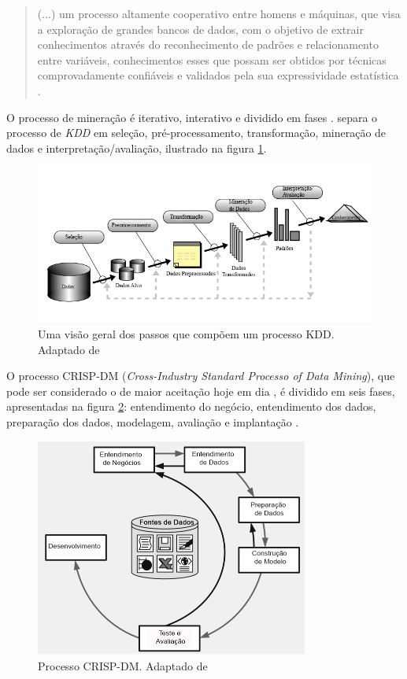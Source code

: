 \begin{quote}
    (...) um processo altamente cooperativo entre homens e máquinas, que visa a exploração de grandes bancos de dados, com o objetivo de extrair conhecimentos através do reconhecimento de padrões e relacionamento entre variáveis, conhecimentos esses que possam ser obtidos por técnicas comprovadamente confiáveis e validados pela sua expressividade estatística \cite[p.~1-2]{cortes2002mineraccao}.
\end{quote}

O processo de mineração é iterativo, interativo e dividido em fases \cite{camilo2009mineraccao}.  separa o processo de \textit{KDD} em seleção, pré-processamento, transformação, mineração de dados e interpretação/avaliação, ilustrado na figura \ref{fig:kdd-geral}.

\begin{figure}[h!]
    \includegraphics[width=\textwidth]{img/kdd.png}
    \caption{Uma visão geral dos passos que compõem um processo KDD. Adaptado de }
    \centering
    \label{fig:kdd-geral}
\end{figure}

O processo CRISP-DM (\textit{Cross-Industry Standard Processo of Data Mining}), que pode ser considerado o de maior aceitação hoje em dia \cite{camilo2009mineraccao}, é dividido em seis fases, apresentadas na figura \ref{fig:crisp}: entendimento do negócio, entendimento dos dados, preparação dos dados, modelagem, avaliação e implantação \cite{olson2008advanced}.

\begin{figure}[h]
\centering
\includegraphics[width=0.8\textwidth]{img/crisp.png}
\caption{Processo CRISP-DM. Adaptado de }
\label{fig:crisp}
\end{figure}


